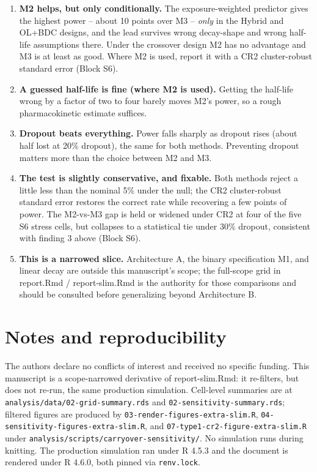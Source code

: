 \documentclass[
  11pt,
]{article}
\begin{document}
\begin{enumerate}
\def\labelenumi{\arabic{enumi}.}
\item
  \textbf{M2 helps, but only conditionally.} The exposure-weighted
  predictor gives the highest power -- about 10 points over M3 --
  \emph{only} in the Hybrid and OL+BDC designs, and the lead survives
  wrong decay-shape and wrong half-life assumptions there. Under
  the crossover design M2 has no advantage and M3 is at least as
  good. Where M2 is used, report it with a CR2 cluster-robust
  standard error (Block S6).
\item
  \textbf{A guessed half-life is fine (where M2 is used).} Getting the
  half-life wrong by a factor of two to four barely moves M2's
  power, so a rough pharmacokinetic estimate suffices.
\item
  \textbf{Dropout beats everything.} Power falls sharply as dropout
  rises (about half lost at 20\% dropout), the same for both
  methods. Preventing dropout matters more than the choice between
  M2 and M3.
\item
  \textbf{The test is slightly conservative, and fixable.} Both methods
  reject a little less than the nominal 5\% under the null; the CR2
  cluster-robust standard error restores the correct rate while
  recovering a few points of power. The M2-vs-M3 gap is held or
  widened under CR2 at four of the five S6 stress cells, but
  collapses to a statistical tie under 30\% dropout, consistent with
  finding 3 above (Block S6).
\item
  \textbf{This is a narrowed slice.} Architecture A, the binary
  specification M1, and linear decay are outside this manuscript's
  scope; the full-scope grid in report.Rmd / report-slim.Rmd is the
  authority for those comparisons and should be consulted before
  generalizing beyond Architecture B.
\end{enumerate}

\section*{Notes and reproducibility}\label{notes-and-reproducibility}

The authors declare no conflicts of interest and received no
specific funding. This manuscript is a scope-narrowed derivative of
report-slim.Rmd: it re-filters, but does not re-run, the same
production simulation. Cell-level summaries are at
\texttt{analysis/data/02-grid-summary.rds} and
\texttt{02-sensitivity-summary.rds}; filtered figures are produced by
\texttt{03-render-figures-extra-slim.R}, \texttt{04-sensitivity-figures-extra-slim.R},
and \texttt{07-type1-cr2-figure-extra-slim.R} under
\texttt{analysis/scripts/carryover-sensitivity/}. No simulation runs during
knitting. The production simulation ran under R 4.5.3 and the
document is rendered under R 4.6.0, both pinned via \texttt{renv.lock}.
\end{document}
